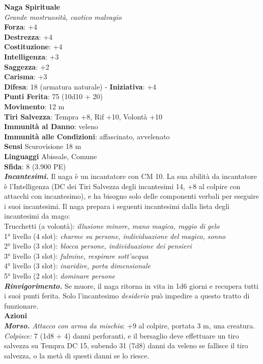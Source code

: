 \begin{multicols}{2}
\medskip\textbf{Naga Spirituale}\\
\emph{Grande mostruosità, caotico malvagio}\\
\textbf{Forza}: +4\\
\textbf{Destrezza}: +4\\
\textbf{Costituzione}: +4\\
\textbf{Intelligenza}: +3\\
\textbf{Saggezza}: +2\\
\textbf{Carisma}: +3\\
\textbf{Difesa}: 18 (armatura naturale) - \textbf{Iniziativa}: +4\\
\textbf{Punti Ferita}: 75 (10d10 + 20)\\
\textbf{Movimento}: 12 m\\
\textbf{Tiri Salvezza}: Tempra +8, Rif +10, Volontà +10\\
\textbf{Immunità al Danno}: veleno\\
\textbf{Immunità alle Condizioni}: affascinato, avvelenato\\
\textbf{Sensi} Scurovisione 18 m\\
\textbf{Linguaggi} Abissale, Comune\\
\textbf{Sfida}: 8 (3.900 PE)\smallskip\\
\emph{\textbf{Incantesimi.}} Il naga è un incantatore con CM 10. La sua abilità da incantatore è l'Intelligenza (DC dei Tiri Salvezza degli incantesimi 14, +8 al colpire con attacchi con incantesimo), e ha bisogno solo delle componenti verbali per eseguire i suoi incantesimi. Il naga prepara i seguenti incantesimi dalla lista degli incantesimi da mago: \\
Trucchetti (a volontà): \emph{illusione minore, mano magica, raggio di} \emph{gelo}\\
1° livello (4 slot): \emph{charme su persone, individuazione del magico,} \emph{sonno}\\
2° livello (3 slot): \emph{blocca persone, individuazione dei pensieri}\\
3° livello (3 slot): \emph{fulmine, respirare sott'acqua}\\
4° livello (3 slot): \emph{inaridire, porta dimensionale}\\
5° livello (2 slot): \emph{dominare persone}\\
\emph{\textbf{Rinvigorimento.}} Se muore, il naga ritorna in vita in 1d6 giorni e recupera tutti i suoi punti ferita. Solo l'incantesimo \emph{desiderio} può impedire a questo tratto di funzionare.\\
\smallskip\textbf{Azioni}\\
\emph{\textbf{Morso.} Attacco con arma da mischia}: +9 al colpire, portata 3 m, una creatura.\\
\emph{Colpisce:} 7 (1d8 + 4) danni perforanti, e il bersaglio deve effettuare un tiro salvezza su Tempra DC  15, subendo 31 (7d8) danni da veleno se fallisce il tiro salvezza, o la metà di questi danni se lo riesce.\\


\end{multicols}

